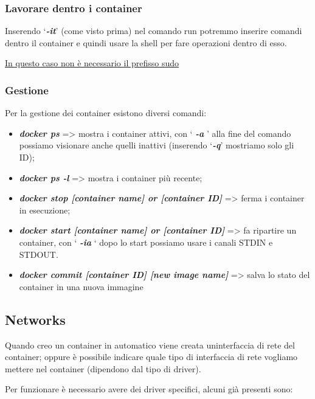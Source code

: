 \subsubsection{Lavorare dentro i
container}\label{lavorare-dentro-i-container}

Inserendo `\emph{\textbf{-it}}' (come visto prima) nel comando run
potremmo inserire comandi dentro il container e quindi usare la shell
per fare operazioni dentro di esso.

\ul{In questo caso non è necessario il prefisso sudo}

\subsubsection{Gestione}\label{gestione}

Per la gestione dei container esistono diversi comandi:

\begin{itemize}
\item
  \emph{\textbf{docker ps}} =\textgreater{} mostra i container attivi,
  con ` \emph{\textbf{-a}} ' alla fine del comando possiamo visionare
  anche quelli inattivi (inserendo `\emph{\textbf{-q}}' mostriamo solo
  gli ID);
\item
  \emph{\textbf{docker ps -l}} =\textgreater{} mostra i container più
  recente;
\item
  \emph{\textbf{docker stop {[}container name{]} or {[}container ID{]}}}
  =\textgreater{} ferma i container in esecuzione;
\item
  \emph{\textbf{docker start {[}container name{]} or {[}container
  ID{]}}} =\textgreater{} fa ripartire un container, con `
  \emph{\textbf{-ia}} ` dopo lo start possiamo usare i canali STDIN e
  STDOUT.
\item
  \emph{\textbf{docker commit {[}container ID{]} {[}new image name{]}}}
  =\textgreater{} salva lo stato del container in una nuova immagine
\end{itemize}

\subsection{Networks}\label{networks}

Quando creo un container in automatico viene creata
un\textquotesingle interfaccia di rete del container; oppure è possibile
indicare quale tipo di interfaccia di rete vogliamo mettere nel
container (dipendono dal tipo di driver).

Per funzionare è necessario avere dei driver specifici, alcuni già
presenti sono:

